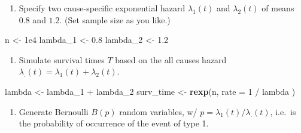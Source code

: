 \documentclass[]{book}
\newenvironment{Shaded}{\begin{snugshade}}{\end{snugshade}}
\newcommand{\KeywordTok}[1]{\textcolor[rgb]{0.13,0.29,0.53}{\textbf{{#1}}}}
\newcommand{\DataTypeTok}[1]{\textcolor[rgb]{0.13,0.29,0.53}{{#1}}}
\newcommand{\DecValTok}[1]{\textcolor[rgb]{0.00,0.00,0.81}{{#1}}}
\newcommand{\FloatTok}[1]{\textcolor[rgb]{0.00,0.00,0.81}{{#1}}}
\newcommand{\StringTok}[1]{\textcolor[rgb]{0.31,0.60,0.02}{{#1}}}
\newcommand{\CommentTok}[1]{\textcolor[rgb]{0.56,0.35,0.01}{\textit{{#1}}}}
\newcommand{\NormalTok}[1]{{#1}}
\providecommand{\tightlist}{%
  \setlength{\itemsep}{0pt}\setlength{\parskip}{0pt}}
\theoremstyle{definition}
\theoremstyle{definition}
\theoremstyle{definition}
\theoremstyle{remark}
\begin{document}
\begin{enumerate}
\def\labelenumi{\arabic{enumi}.}
\tightlist
\item
  Specify two cause-specific exponential hazard \(\lambda_1(t)\) and
  \(\lambda_2(t)\) of means \(0.8\) and \(1.2\). (Set sample size as you
  like.)
\end{enumerate}

\begin{Shaded}
\begin{Highlighting}[]
\NormalTok{n        <-}\StringTok{ }\FloatTok{1e4}
\NormalTok{lambda_1 <-}\StringTok{ }\FloatTok{0.8}
\NormalTok{lambda_2 <-}\StringTok{ }\FloatTok{1.2}
\end{Highlighting}
\end{Shaded}

\begin{enumerate}
\def\labelenumi{\arabic{enumi}.}
\setcounter{enumi}{1}
\tightlist
\item
  Simulate survival times \(T\) based on the all causes hazard
  \(\lambda_.(t) = \lambda_1(t) + \lambda_2(t)\).
\end{enumerate}

\begin{Shaded}
\begin{Highlighting}[]
\NormalTok{lambda    <-}\StringTok{ }\NormalTok{lambda_1 +}\StringTok{ }\NormalTok{lambda_2 }
\NormalTok{surv_time <-}\StringTok{ }\KeywordTok{rexp}\NormalTok{(n,}
  \DataTypeTok{rate =} \DecValTok{1} \NormalTok{/}\StringTok{ }\NormalTok{lambda}
\NormalTok{)}
\end{Highlighting}
\end{Shaded}

\begin{enumerate}
\def\labelenumi{\arabic{enumi}.}
\setcounter{enumi}{2}
\tightlist
\item
  Generate Bernoulli \(B(p)\) random variables, w/
  \(p = \lambda_1(t) / \lambda_.(t)\), i.e.~is the probability of
  occurrence of the event of type 1.
\end{enumerate}

\begin{Shaded}
\end{Shaded}
\end{document}
